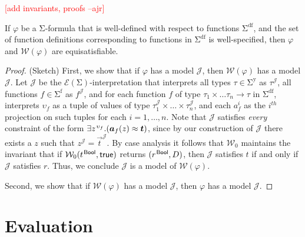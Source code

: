 \documentclass[runningheads,a4paper]{llncs}
\newcommand{\con}[1]{\mathsf{#1}}
\let\oldSigma=\Sigma
\def\Sigma{\mathrm{\oldSigma}}
\newcommand{\teq}{\approx}
\newcommand{\terms}{\mathcal{T}}
\newcommand{\vars}{\mathbf{V}}
\newcommand{\M}{\mathcal{M}}
\newcommand{\I}{\mathcal{J}} %
\newcommand{\J}{\mathcal{J}}
\newcommand{\conv}{\mathcal{W}}
\newcommand{\ssorts}[1]{#1^\mathrm{y}}
\newcommand{\sfuns}[1]{#1^\mathrm{f}}
\newcommand{\sfundefs}[1]{#1^\mathrm{df}}
\newcommand{\ptrue}{\con{true}}
\newcommand{\Bool}{\con{Bool}}
\newcommand{\farg}[1]{a_{#1}}
\newcommand{\vecfarg}[1]{\vec{a}_{#1}}
\newcommand{\fargsort}[1]{\upsilon_{#1}}
\newcommand{\extendsig}[1]{\mathcal{E}( #1 )}
\newcommand{\rem}[1]{\textcolor{red}{[#1]}}
\newcommand{\ajr}[1]{\rem{#1 --ajr}}
\newcommand{\vthinspace}{\kern+0.083333em}
\newcommand{\typ}[1]{^{\vthinspace #1}}
\begin{document}
\ajr{add invariants, proofs}


\begin{theorem}
If $\varphi$ be a $\Sigma$-formula that is well-defined with respect to functions $\sfundefs{\Sigma}$,
and the set of function definitions corresponding to functions in $\sfundefs{\Sigma}$ is well-specified,
then $\varphi$ and $\conv( \varphi )$ are equisatisfiable.
\end{theorem}
\begin{proof}
(Sketch)  First, we show that if $\varphi$ has a model $\I$, then $\conv( \varphi )$ has a model $\J$.
Let $\J$ be the $\extendsig{\Sigma}$-interpretation that interprets all types $\tau \in \ssorts{\Sigma}$ as $\tau^\I$,
all functions $f \in \sfuns{\Sigma}$ as $f^\I$,
and for each function $f$ of type $\tau_1 \times \ldots \tau_n \rightarrow \tau$ in $\sfundefs{\Sigma}$, 
interprets $\fargsort{f}$ as a tuple of values of type $\tau_1^\I \times \ldots \times \tau_n^\I$,
and each $\farg{f}^i$ as the $i^{th}$ projection on such tuples for each $i = 1, \ldots, n$.
Note that $\J$ satisfies \emph{every} constraint of the form $\exists z\typ{\fargsort{f}}. ( \vecfarg{f}( z ) \teq \vec t )$,
since by our construction of $\J$ there exists a $z$ such that $z^\J = \vec t^\J$.
By case analysis it follows that $\conv_0$ maintains the invariant that
if $\conv_0( t\typ{\Bool}, \ptrue )$ returns $( r\typ{\Bool}, D )$,
then $\I$ satisfies $t$ if and only if $\J$ satisfies $r$.
Thus, we conclude $\J$ is a model of $\conv( \varphi )$.

Second, we show that if $\conv( \varphi )$ has a model $\I$, then $\varphi$ has a model $\J$.

\end{proof}

\section{Evaluation}
\label{sec:evaluation}
\end{document}

